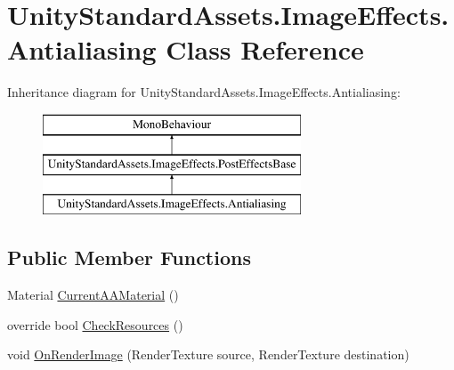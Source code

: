\hypertarget{class_unity_standard_assets_1_1_image_effects_1_1_antialiasing}{}\section{Unity\+Standard\+Assets.\+Image\+Effects.\+Antialiasing Class Reference}
\label{class_unity_standard_assets_1_1_image_effects_1_1_antialiasing}
Inheritance diagram for Unity\+Standard\+Assets.\+Image\+Effects.\+Antialiasing\+:\begin{figure}[H]
\begin{center}
\leavevmode
\includegraphics[height=3.000000cm]{class_unity_standard_assets_1_1_image_effects_1_1_antialiasing}
\end{center}
\end{figure}
\subsection*{Public Member Functions}
\begin{DoxyCompactItemize}
\item 
Material \mbox{\hyperlink{class_unity_standard_assets_1_1_image_effects_1_1_antialiasing_afd5cd7bec2f863f5786b9f94a7fd6782}{Current\+A\+A\+Material}} ()
\item 
override bool \mbox{\hyperlink{class_unity_standard_assets_1_1_image_effects_1_1_antialiasing_a9a152887fccdeaf69e9041c84fc42051}{Check\+Resources}} ()
\item 
void \mbox{\hyperlink{class_unity_standard_assets_1_1_image_effects_1_1_antialiasing_ae00df4da0cf6c832f8bd75b557338cb0}{On\+Render\+Image}} (Render\+Texture source, Render\+Texture destination)
\end{DoxyCompactItemize}
